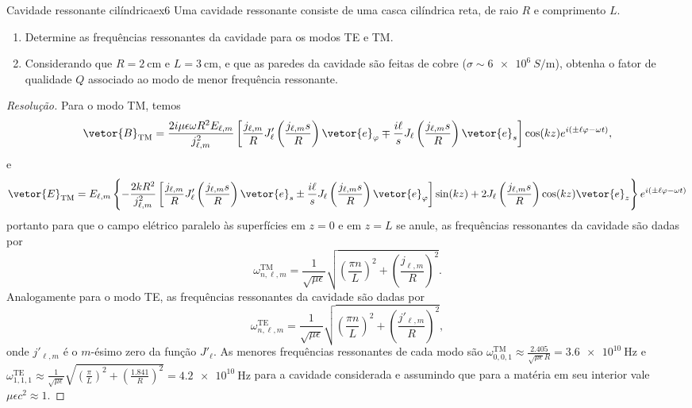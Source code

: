 \begin{exercício}{Cavidade ressonante cilíndrica}{ex6}
    Uma cavidade ressonante consiste de uma casca cilíndrica reta, de raio \(R\) e comprimento \(L\).
    \begin{enumerate}[label=(\alph*)]
        \item Determine as frequências ressonantes da cavidade para os modos TE e TM.
        \item Considerando que \(R = \SI{2}{\centi\meter}\) e \(L = \SI{3}{\centi\meter}\), e que as paredes da cavidade são feitas de cobre (\(\sigma \sim \SI{6e6}{S\per\meter}\)), obtenha o fator de qualidade \(Q\) associado ao modo de menor frequência ressonante.
    \end{enumerate}
\end{exercício}
\begin{proof}[Resolução]
    Para o modo TM, temos
    \begin{equation*}
        \vetor{B}_\mathrm{TM} = \frac{2i \mu \epsilon \omega R^2 E_{\ell, m}}{j_{\ell,m}^2}\left[\frac{j_{\ell, m}}{R} J_\ell'\left(\frac{j_{\ell,m} s}{R}\right) \vetor{e}_\varphi \mp \frac{i \ell}{s} J_\ell\left(\frac{j_{\ell,m} s}{R}\right)\vetor{e}_s\right] \cos(k z) e^{i(\pm \ell \varphi - \omega t)},
    \end{equation*}
    e
    \begin{equation*}
        \vetor{E}_{\mathrm{TM}} = E_{\ell, m}\left\{-\frac{2 kR^2}{j_{\ell, m}^2}\left[\frac{j_{\ell, m}}{R} J_\ell'\left(\frac{j_{\ell,m} s}{R}\right) \vetor{e}_s \pm \frac{i \ell}{s} J_\ell\left(\frac{j_{\ell,m} s}{R}\right)\vetor{e}_\varphi\right]\sin(kz) + 2J_\ell\left(\frac{j_{\ell, m} s}{R}\right) \cos(kz)\vetor{e}_z\right\}e^{i(\pm \ell \varphi - \omega t)}
    \end{equation*}
    portanto para que o campo elétrico paralelo às superfícies em \(z = 0\) e em \(z = L\) se anule, as frequências ressonantes da cavidade são dadas por
    \begin{equation*}
        \omega^\mathrm{TM}_{n,\ell,m} = \frac{1}{\sqrt{\mu \epsilon}}\sqrt{\left(\frac{\pi n}{L}\right)^2 + \left(\frac{j_{\ell,m}}{R}\right)^2}.
    \end{equation*}
    Analogamente para o modo TE, as frequências ressonantes da cavidade são dadas por 
    \begin{equation*}
        \omega^\mathrm{TE}_{n,\ell,m} = \frac{1}{\sqrt{\mu \epsilon}}\sqrt{\left(\frac{\pi n}{L}\right)^2 + \left(\frac{j'_{\ell,m}}{R}\right)^2},
    \end{equation*}
    onde \(j'_{\ell,m}\) é o \(m\)-ésimo zero da função \(J'_{\ell}.\) As menores frequências ressonantes de cada modo são  \(\omega^\mathrm{TM}_{0, 0, 1} \approx \frac{2.405}{\sqrt{\mu \epsilon} R} = \SI{3.6e10}{\hertz}\) e \(\omega^\mathrm{TE}_{1,1,1} \approx \frac{1}{\sqrt{\mu \epsilon}}\sqrt{\left(\frac{\pi}{L}\right)^2 + \left(\frac{1.841}{R}\right)^2} = \SI{4.2e10}{\hertz}\) para a cavidade considerada e assumindo que para a matéria em seu interior vale \(\mu \epsilon c^2 \approx 1\).


\end{proof}
